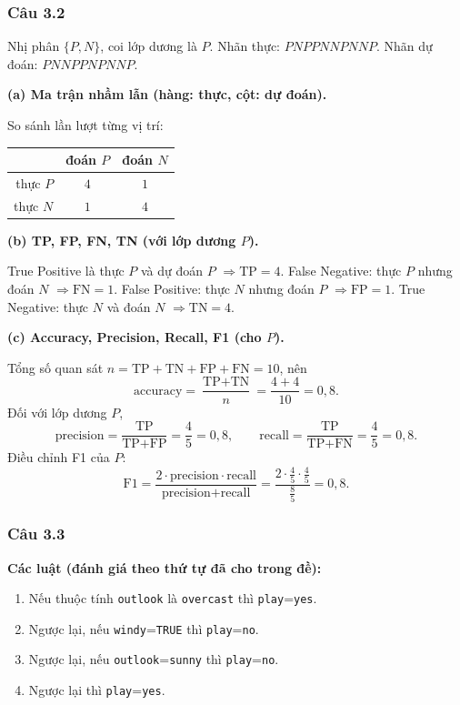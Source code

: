\subsubsection*{Câu 3.2}

Nhị phân $\{P,N\}$, coi lớp dương là $P$.
Nhãn thực: $PNPPNNPNNP$.
Nhãn dự đoán: $PNNPPNPNNP$.

\medskip
\textbf{(a) Ma trận nhầm lẫn (hàng: thực, cột: dự đoán).}

So sánh lần lượt từng vị trí:
\begin{center}
\small
\begin{tabular}{r|cc}
{} & đoán $P$ & đoán $N$ \\
\hline
thực $P$ & $4$ & $1$ \\
thực $N$ & $1$ & $4$ \\
\end{tabular}
\end{center}

\medskip
\textbf{(b) TP, FP, FN, TN (với lớp dương $P$).}

True Positive là thực $P$ và dự đoán $P$ $\Rightarrow\text{TP}=4$.
False Negative: thực $P$ nhưng đoán $N$ $\Rightarrow\text{FN}=1$.
False Positive: thực $N$ nhưng đoán $P$ $\Rightarrow\text{FP}=1$.
True Negative: thực $N$ và đoán $N$ $\Rightarrow\text{TN}=4$.

\medskip
\textbf{(c) Accuracy, Precision, Recall, F1 (cho $P$).}

Tổng số quan sát $n=\text{TP}+\text{TN}+\text{FP}+\text{FN}=10$, nên
\[
\text{accuracy}=\frac{\text{TP}+\text{TN}}{n}=\frac{4+4}{10}=0{,}8.
\]
Đối với lớp dương $P$,
\[
\text{precision}=\frac{\text{TP}}{\text{TP}+\text{FP}}=\frac{4}{5}=0{,}8,\qquad
\text{recall}=\frac{\text{TP}}{\text{TP}+\text{FN}}=\frac{4}{5}=0{,}8.
\]
Điều chỉnh F1 của $P$:
\[
\text{F1}=\frac{2\cdot\text{precision}\cdot\text{recall}}{\text{precision}+\text{recall}}
=\frac{2\cdot \frac45\cdot\frac45}{\frac85}=0{,}8.
\]

\subsubsection*{Câu 3.3}

\textbf{Các luật (đánh giá theo thứ tự đã cho trong đề):}
\begin{enumerate}[label=\arabic*., nosep]
  \item Nếu thuộc tính \texttt{outlook} là \texttt{overcast} thì \texttt{play}=\texttt{yes}.
  \item Ngược lại, nếu \texttt{windy}=\texttt{TRUE} thì \texttt{play}=\texttt{no}.
  \item Ngược lại, nếu \texttt{outlook}=\texttt{sunny} thì \texttt{play}=\texttt{no}.
  \item Ngược lại thì \texttt{play}=\texttt{yes}.
\end{enumerate}


